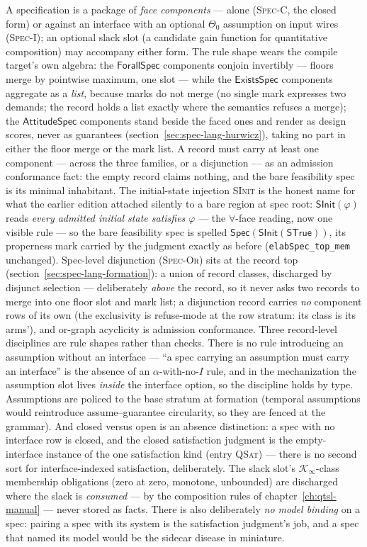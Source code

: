 A specification is a package of \emph{face components} --- alone
(\textsc{Spec-C}, the closed form) or against an interface with an
optional $\Theta_0$ assumption on input wires (\textsc{Spec-I}); an
optional slack slot (a candidate gain function for quantitative
composition) may accompany either form. The rule shape wears the compile
target's own algebra: the $\mathsf{ForallSpec}$ components conjoin
invertibly --- floors merge by pointwise maximum, one slot --- while
the $\mathsf{ExistsSpec}$ components aggregate as a \emph{list},
because marks do not merge (no single mark expresses two demands;
the record holds a list exactly where the semantics refuses a
merge); the $\mathsf{AttitudeSpec}$ components stand beside the
faced ones and render as design scores, never as guarantees
(section~\ref{sec:spec-lang-hurwicz}), taking no part in either the
floor merge or the mark list. A record must carry at least one
component --- across the three families, or a disjunction --- as an
admission conformance fact: the empty record claims nothing, and
the bare feasibility spec is its minimal inhabitant.
The initial-state injection \textsc{SInit} is the honest
name for what the earlier edition attached silently to a bare region
at spec root: $\mathsf{SInit}(\varphi)$ reads \emph{every admitted
initial state satisfies $\varphi$} --- the $\forall$-face reading,
now one visible rule --- so the bare feasibility spec is spelled
$\mathsf{Spec}(\mathsf{SInit}(\mathsf{STrue}))$, its properness mark
carried by the judgment exactly as before
(\texttt{elabSpec\_top\_mem} unchanged). Spec-level disjunction
(\textsc{Spec-Or}) sits at the record top
(section~\ref{sec:spec-lang-formation}): a union of record classes,
discharged by disjunct selection --- deliberately \emph{above} the
record, so it never asks two records to merge into one floor slot
and mark list; a disjunction record carries \emph{no} component rows
of its own (the exclusivity is refuse-mode at the row stratum: its
class is its arms'), and or-graph acyclicity is admission
conformance. Three record-level disciplines are rule shapes
rather than checks. There is no rule introducing an assumption without an
interface --- ``a spec carrying an assumption must carry an
interface'' is the absence of an $\alpha$-with-no-$I$ rule, and in
the mechanization the assumption slot lives \emph{inside} the
interface option, so the discipline holds by type. Assumptions are
policed to the base stratum at formation (temporal assumptions would
reintroduce assume--guarantee circularity, so they are fenced at the
grammar). And closed versus open is an absence distinction: a spec
with no interface row is closed, and the closed satisfaction
judgment is the empty-interface instance of the one satisfaction
kind (entry \textsc{QSat}) --- there is no second sort for
interface-indexed satisfaction, deliberately. The slack slot's
$\mathcal{K}_\infty$-class membership obligations (zero at zero,
monotone, unbounded) are discharged where the slack is
\emph{consumed} --- by the composition rules of
chapter~\ref{ch:qtsl-manual} --- never stored as facts. There is
also deliberately \emph{no model binding} on a spec: pairing a spec
with its system is the satisfaction judgment's job, and a spec that
named its model would be the sidecar disease in miniature.

